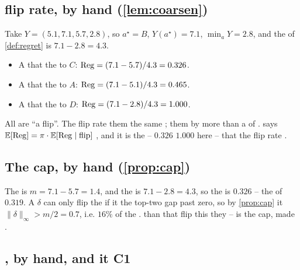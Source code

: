 \subsection{  flip rate, by hand (\cref{lem:coarsen})}

Take $Y=(5.1,7.1,5.7,2.8)$, so $a^\star = B$, $Y(a^\star)=7.1$, $\min_a Y = 2.8$,
and the  of \cref{def:regret} is $7.1-2.8=4.3$.

\begin{itemize}
\item A  that  the  to $C$: $\mathrm{Reg} = (7.1-5.7)/4.3 = 0.326$.
\item A  that  the  to $A$: $\mathrm{Reg} = (7.1-5.1)/4.3 = 0.465$.
\item A  that  the  to $D$: $\mathrm{Reg} = (7.1-2.8)/4.3 = 1.000$.
\end{itemize}
All  are ``a flip''. The flip rate  them the same ; 
 them by more than a  of .  says
$\mathbb{E}[\mathrm{Reg}] = \pi \cdot \mathbb{E}[\mathrm{Reg}\mid\text{flip}]$ , and it is the 
 -- $0.326$  $1.000$ here -- that the flip rate .

\subsection{The  cap, by hand (\cref{prop:cap})}

The  is $m = 7.1-5.7 = 1.4$, and the   is $7.1-2.8=4.3$, so the
  is $0.326$ --   the   of $0.319$. A
 $\delta$ can only flip the  if it  the top-two gap past
zero, so by \cref{prop:cap} it  $\|\delta\|_\infty > m/2 = 0.7$, i.e. 
$16\%$ of the .   than that  flip this 
 they   --  is the cap, made .

\subsection{ , by hand, and it  C1 }

